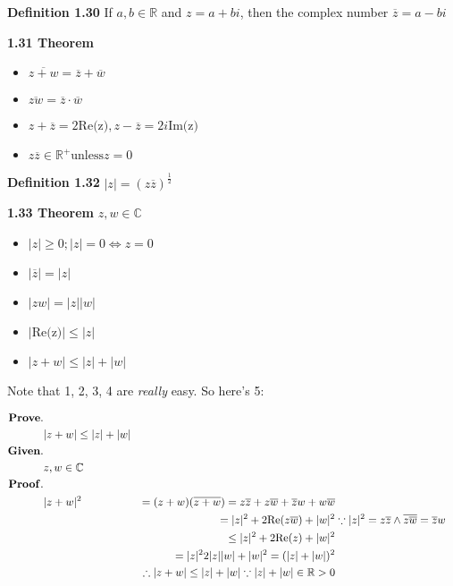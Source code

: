 \documentclass{article}
\newcommand{\DEFINITION}[1]{
  \label{def-#1}
  {\noindent \bf Definition #1}
}
\newcommand{\THEOREM}[1]{
  \label{theorem-#1}
  {\noindent \bf #1 Theorem}
}
\begin{document}
  \pagebreak

  \DEFINITION{1.30} If $a, b \in \mathbb{R}$ and $z = a + bi$, then the complex number $\overline{z} = a - bi$

  \THEOREM{1.31}
  \begin{itemize}
    \item $ \overline{z + w} = \overline{z} + \overline{w} $
    \item $ \overline{zw} = \overline{z} \cdot \overline{w} $
    \item $ z + \overline{z} = 2 \text{Re(z)}, z - \overline{z} = 2 i \text{Im(z)} $
    \item $ z \overline{z} \in \mathbb{R}^{+} \text{unless} z = 0 $
  \end{itemize}

  \DEFINITION{1.32} $ |z| = (z\overline{z})^{\frac{1}{2}} $

  \THEOREM{1.33} $z, w \in \mathbb{C} $
  \begin{itemize}
    \item $ |z| \geq 0; |z| = 0 \iff z = 0 $
    \item $ |\overline{z}| = |z| $
    \item $ |zw| = |z||w| $
    \item $ |\text{Re(z)}| \leq |z| $
    \item $ |z + w| \leq |z| + |w| $
  \end{itemize}

  Note that 1, 2, 3, 4 are \emph{really} easy. So here's 5:

  \begin{align*}
    {\bf Prove.} \\
      & |z + w| \leq |z| + |w| \\
    {\bf Given.} \\
      & z, w \in \mathbb{C} \\
    {\bf Proof.} \\
      & |z+w|^2 & = (z+w)(\overline{z+w}) = z\overline{z} + z\overline{w} + \overline{z}w + w\overline{w} \\
      & & = |z|^2 + 2\text{Re($z\overline{w}$)} + |w|^2 & \because |z|^2 = z\overline{z} \land \overline{z\overline{w}} = \overline{z}w \\
      & & \leq |z|^2 + 2\text{Re($z$)} + |w|^2 \\
      & & = |z|^2 2 |z| |w| + |w|^2 = (|z| + |w|)^2 \\
      & & \therefore |z+w| \leq |z| + |w| \because |z| + |w| \in \mathbb{R} > 0
  \end{align*}
\end{document}
